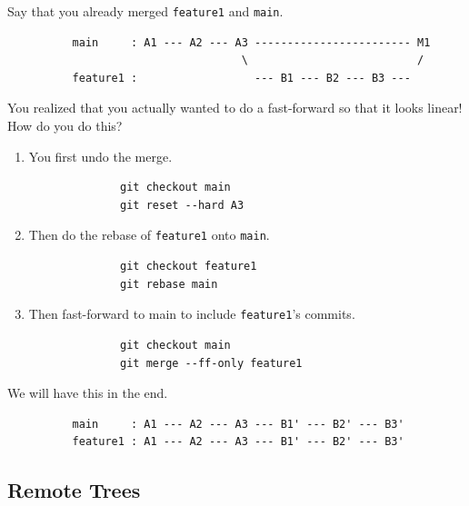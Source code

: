 \documentclass{article}
\begin{document}
      \begin{example}
        Say that you already merged \texttt{feature1} and \texttt{main}. 
        \begin{lstlisting}
          main     : A1 --- A2 --- A3 ------------------------ M1
                                    \                          /
          feature1 :                  --- B1 --- B2 --- B3 ---  
        \end{lstlisting}
        You realized that you actually wanted to do a fast-forward so that it looks linear! How do you do this? 
        \begin{enumerate}
          \item You first undo the merge. 
            \begin{lstlisting}
              git checkout main 
              git reset --hard A3
            \end{lstlisting} 

          \item Then do the rebase of \texttt{feature1} onto \texttt{main}. 
            \begin{lstlisting}
              git checkout feature1 
              git rebase main 
            \end{lstlisting} 

          \item Then fast-forward to main to include \texttt{feature1}'s commits. 
            \begin{lstlisting}
              git checkout main 
              git merge --ff-only feature1
            \end{lstlisting}
        \end{enumerate}
        We will have this in the end. 
        \begin{lstlisting}
          main     : A1 --- A2 --- A3 --- B1' --- B2' --- B3' 
          feature1 : A1 --- A2 --- A3 --- B1' --- B2' --- B3'
        \end{lstlisting}
      \end{example} 

  \subsection{Remote Trees}
\end{document}
